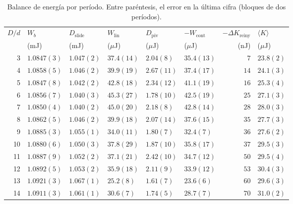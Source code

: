 \documentclass[11pt,a4paper]{article}
\newcommand{\ave}[1]{\langle #1 \rangle}
\newcommand{\Wb}{W_b}
\newcommand{\Wlin}{W_\text{lin}}
\newcommand{\Wcont}{W_\text{cont}}
\newcommand{\Dslide}{D_\text{slide}}
\newcommand{\Dpiv}{D_\text{piv}}
\newcommand{\dKr}{\Delta K_\text{reiny}}
\begin{document}
\begin{table}[ht]
\centering
\small
\caption{Balance de energía por período. Entre paréntesis, el error en la
  última cifra (bloques de dos períodos).}
\label{tab:balance}
\begin{tabular}{rlllllrl}
  \toprule
  $D/d$ & $\Wb$ & $\Dslide$ & $\Wlin$ & $\Dpiv$ & $-\Wcont$ & $-\dKr$ &
    $\ave{K}$ \\
  & (mJ) & (mJ) & ($\mu$J) & ($\mu$J) & ($\mu$J) & (nJ) & ($\mu$J) \\
  \midrule
3 & $1.0847(3)$ & $1.047(2)$ & $37.4(14)$ & $2.04(8)$ & $35.4(13)$ & $7$ & $23.8(2)$ \\
4 & $1.0858(5)$ & $1.046(2)$ & $39.9(19)$ & $2.67(11)$ & $37.4(17)$ & $14$ & $24.1(3)$ \\
5 & $1.0847(8)$ & $1.042(2)$ & $42.8(18)$ & $2.34(12)$ & $41.1(19)$ & $16$ & $25.3(4)$ \\
6 & $1.0856(7)$ & $1.040(3)$ & $45.3(27)$ & $1.78(10)$ & $42.5(19)$ & $25$ & $27.1(3)$ \\
7 & $1.0850(4)$ & $1.040(2)$ & $45.0(20)$ & $2.18(8)$ & $42.8(14)$ & $28$ & $28.0(3)$ \\
8 & $1.0862(5)$ & $1.046(2)$ & $39.9(18)$ & $2.07(14)$ & $37.6(15)$ & $35$ & $27.7(3)$ \\
9 & $1.0885(3)$ & $1.055(1)$ & $34.0(11)$ & $1.80(7)$ & $32.4(7)$ & $36$ & $27.6(2)$ \\
10 & $1.0880(6)$ & $1.050(3)$ & $37.8(29)$ & $1.87(10)$ & $35.8(17)$ & $37$ & $29.5(3)$ \\
11 & $1.0887(9)$ & $1.052(2)$ & $37.1(21)$ & $2.42(10)$ & $34.7(12)$ & $50$ & $29.5(4)$ \\
12 & $1.0892(5)$ & $1.053(2)$ & $35.9(18)$ & $2.11(9)$ & $33.9(12)$ & $53$ & $30.4(3)$ \\
13 & $1.0921(3)$ & $1.067(1)$ & $25.2(8)$ & $1.61(7)$ & $23.6(6)$ & $60$ & $29.6(3)$ \\
14 & $1.0911(3)$ & $1.061(1)$ & $30.6(7)$ & $1.74(5)$ & $28.7(7)$ & $70$ & $31.0(2)$ \\
  \bottomrule
\end{tabular}
\end{table}
\end{document}
